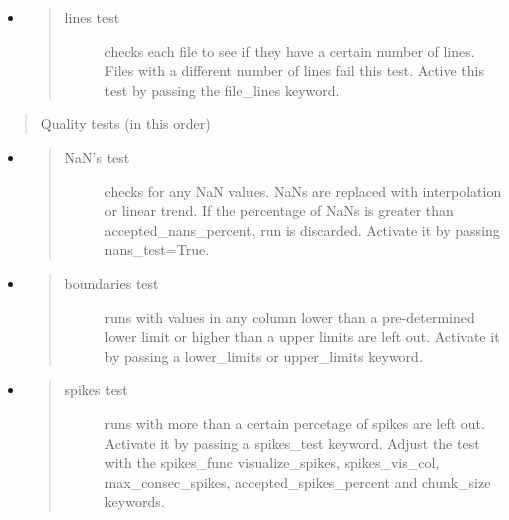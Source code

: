 \documentclass[a4paper,10pt,oneside]{sphinxmanual}
\begin{document}
\begin{fulllineitems}
\begin{itemize}
\begin{quote}
\begin{description}
\end{description}\end{quote}

\item {} \begin{quote}\begin{description}
\item[{lines test}] \leavevmode
checks each file to see if they have a certain number of lines. Files with a different number of lines
fail this test. Active this test by passing the file\_lines keyword.

\end{description}\end{quote}

\end{itemize}
\begin{quote}\begin{description}
\item[{Quality tests (in this order)}] \leavevmode
\end{description}\end{quote}
\begin{itemize}
\item {} \begin{quote}\begin{description}
\item[{NaN's test}] \leavevmode
checks for any NaN values. NaNs are replaced with interpolation or linear trend. If the percentage
of NaNs is greater than accepted\_nans\_percent, run is discarded. Activate it by passing nans\_test=True.

\end{description}\end{quote}

\item {} \begin{quote}\begin{description}
\item[{boundaries test}] \leavevmode
runs with values in any column lower than a pre-determined lower limit or higher
than a upper limits are left out. Activate it by passing a lower\_limits or upper\_limits keyword.

\end{description}\end{quote}

\item {} \begin{quote}\begin{description}
\item[{spikes test}] \leavevmode
runs with more than a certain percetage of spikes are left out.
Activate it by passing a spikes\_test keyword. Adjust the test with the spikes\_func
visualize\_spikes, spikes\_vis\_col, max\_consec\_spikes, accepted\_spikes\_percent and chunk\_size keywords.


\end{description}
\end{quote}
\end{itemize}
\end{fulllineitems}
\end{document}

